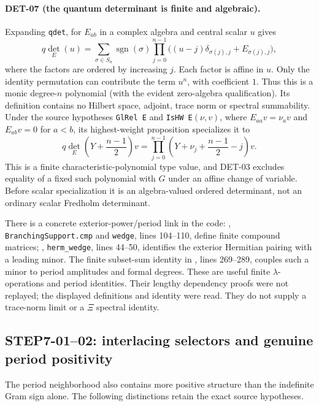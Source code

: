 \documentclass[11pt,a4paper]{article}
\newcommand{\fid}[1]{\textsf{#1}}
\begin{document}
\paragraph{DET-07 (the quantum determinant is finite and algebraic).}
Expanding \texttt{qdet}, for $E_{ab}$ in a complex algebra and central scalar $u$ gives
\[
 q\det_E(u)=\sum_{\sigma\in S_n}\operatorname{sgn}(\sigma)
 \prod_{j=0}^{n-1}\bigl((u-j)\delta_{\sigma(j),j}+E_{\sigma(j),j}\bigr),
\]
where the factors are ordered by increasing $j$. Each factor is affine in $u$. Only the identity permutation can contribute the term $u^n$, with coefficient $1$. Thus this is a monic degree-$n$ polynomial (with the evident zero-algebra qualification). Its definition contains no Hilbert space, adjoint, trace norm or spectral summability. Under the source hypotheses \texttt{GlRel E} and \texttt{IsHW E}$(\nu,v)$, where $E_{aa}v=\nu_a v$ and $E_{ab}v=0$ for $a<b$, its highest-weight proposition specializes it to
\[
 q\det_E\!\left(Y+\frac{n-1}{2}\right)v
 =\prod_{j=0}^{n-1}\left(Y+\nu_j+\frac{n-1}{2}-j\right)v.
\]
This is a finite characteristic-polynomial type value, and \fid{DET-03} excludes equality of a fixed such polynomial with $G$ under an affine change of variable. Before scalar specialization it is an algebra-valued ordered determinant, not an ordinary scalar Fredholm determinant.

There is a concrete exterior-power/period link in the code: , \texttt{BranchingSupport.cmp} and \texttt{wedge}, lines 104--110, define finite compound matrices; , \texttt{herm\_wedge}, lines 44--50, identifies the exterior Hermitian pairing with a leading minor. The finite subset-sum identity in , lines 269--289, couples such a minor to period amplitudes and formal degrees. These are useful finite $\lambda$-operations and period identities. Their lengthy dependency proofs were not replayed; the displayed definitions and identity were read. They do not supply a trace-norm limit or a $\Xi$ spectral identity.

\subsection{STEP7-01--02: interlacing selectors and genuine period positivity}
The period neighborhood also contains more positive structure than the indefinite Gram sign alone. The following distinctions retain the exact source hypotheses.
\end{document}
